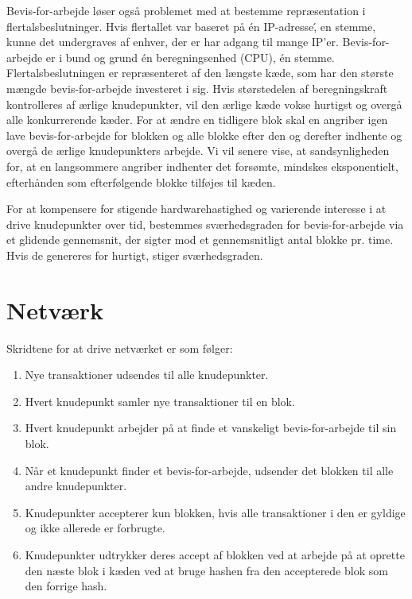 \documentclass{article}
\begin{document}
Bevis-for-arbejde løser også problemet med at bestemme repræsentation i flertalsbeslutninger. Hvis flertallet var baseret på \'en IP-adresse\', en stemme, kunne det undergraves
af enhver, der er har adgang til mange IP'er. Bevis-for-arbejde er i bund og grund \'en beregningsenhed (CPU), \'en stemme. Flertalsbeslutningen er repræsenteret af den længste
kæde, som har den største mængde bevis-for-arbejde investeret i sig. Hvis størstedelen af beregningskraft kontrolleres af ærlige knudepunkter, vil den ærlige kæde vokse hurtigst
og overgå alle konkurrerende kæder. For at ændre en tidligere blok skal en angriber igen lave bevis-for-arbejde for blokken og alle blokke efter den og derefter indhente og overgå
de ærlige knudepunkters arbejde. Vi vil senere vise, at sandsynligheden for, at en langsommere angriber indhenter det forsømte, mindskes eksponentielt, efterhånden som
efterfølgende blokke tilføjes til kæden.

For at kompensere for stigende hardwarehastighed og varierende interesse i at drive knudepunkter over tid, bestemmes sværhedsgraden for bevis-for-arbejde via et glidende
gennemsnit, der sigter mod et gennemsnitligt antal blokke pr. time. Hvis de genereres for hurtigt, stiger sværhedsgraden.

\section{Netværk}\label{sec:network}
Skridtene for at drive netværket er som følger:
\begin{enumerate}[label=\arabic*)]%
         \item Nye transaktioner udsendes til alle knudepunkter.
         \item Hvert knudepunkt samler nye transaktioner til en blok.
         \item Hvert knudepunkt arbejder på at finde et vanskeligt bevis-for-arbejde til sin blok.
         \item Når et knudepunkt finder et bevis-for-arbejde, udsender det blokken til alle andre knudepunkter.
         \item Knudepunkter accepterer kun blokken, hvis alle transaktioner i den er gyldige og ikke allerede er forbrugte.
         \item Knudepunkter udtrykker deres accept af blokken ved at arbejde på at oprette den næste blok i kæden ved at bruge hashen fra den accepterede blok som den forrige hash.
\end{enumerate}
\end{document}
